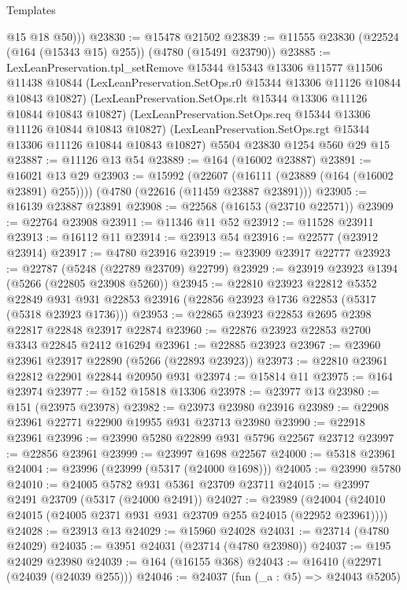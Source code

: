 \begin{lexlean}{Templates}
\begin{coremodule}
          @15
          @18
          @50)))
@23830 := @15478 @21502
@23839 := @11555 @23830 (@22524 (@164 (@15343 @15) @255)) (@4780 (@15491 @23790))
@23885 := LexLeanPreservation.tpl_setRemove
    @15344
    @15343
    @13306
    @11577
    @11506
    @11438
    @10844
    (LexLeanPreservation.SetOps.r0 @15344 @13306 @11126 @10844 @10843 @10827)
    (LexLeanPreservation.SetOps.rlt @15344 @13306 @11126 @10844 @10843 @10827)
    (LexLeanPreservation.SetOps.req @15344 @13306 @11126 @10844 @10843 @10827)
    (LexLeanPreservation.SetOps.rgt @15344 @13306 @11126 @10844 @10843 @10827)
    @5504
    @23830
    @1254
    @560
    @29
    @15
@23887 := @11126 @13 @54
@23889 := @164 (@16002 @23887)
@23891 := @16021 @13 @29
@23903 := @15992
    (@22607 (@16111 (@23889 (@164 (@16002 @23891) @255))))
    (@4780 (@22616 (@11459 @23887 @23891)))
@23905 := @16139 @23887 @23891
@23908 := @22568 (@16153 (@23710 @22571))
@23909 := @22764 @23908
@23911 := @11346 @11 @52
@23912 := @11528 @23911
@23913 := @16112 @11
@23914 := @23913 @54
@23916 := @22577 (@23912 @23914)
@23917 := @4780 @23916
@23919 := @23909 @23917 @22777
@23923 := @22787 (@5248 (@22789 @23709) @22799)
@23929 := @23919 @23923 @1394 (@5266 (@22805 @23908 @5260))
@23945 := @22810
    @23923
    @22812
    @5352
    @22849
    @931
    @931
    @22853
    @23916
    (@22856 @23923 @1736 @22853 (@5317 (@5318 @23923 @1736)))
@23953 := @22865 @23923 @22853 @2695 @2398 @22817 @22848 @23917 @22874
@23960 := @22876 @23923 @22853 @2700 @3343 @22845 @2412 @16294
@23961 := @22885 @23923
@23967 := @23960 @23961 @23917 @22890 (@5266 (@22893 @23923))
@23973 := @22810 @23961 @22812 @22901 @22844 @20950 @931
@23974 := @15814 @11
@23975 := @164 @23974
@23977 := @152 @15818 @13306
@23978 := @23977 @13
@23980 := @151 (@23975 @23978)
@23982 := @23973 @23980 @23916
@23989 := @22908 @23961 @22771 @22900 @19955 @931 @23713 @23980
@23990 := @22918 @23961
@23996 := @23990 @5280 @22899 @931 @5796 @22567 @23712
@23997 := @22856 @23961
@23999 := @23997 @1698 @22567
@24000 := @5318 @23961
@24004 := @23996 (@23999 (@5317 (@24000 @1698)))
@24005 := @23990 @5780
@24010 := @24005 @5782 @931 @5361 @23709 @23711
@24015 := @23997 @2491 @23709 (@5317 (@24000 @2491))
@24027 := @23989
    (@24004 (@24010 @24015 (@24005 @2371 @931 @931 @23709 @255 @24015 (@22952 @23961))))
@24028 := @23913 @13
@24029 := @15960 @24028
@24031 := @23714 (@4780 @24029)
@24035 := @3951 @24031 (@23714 (@4780 @23980))
@24037 := @195 @24029 @23980
@24039 := @164 (@16155 @368)
@24043 := @16410 (@22971 (@24039 (@24039 @255)))
@24046 := @24037 (fun (_a : @5) => @24043 @5205)

\end{coremodule}
\end{lexlean}
